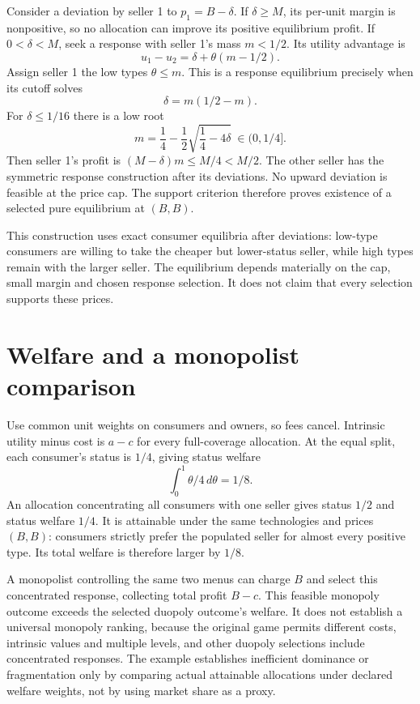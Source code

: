\documentclass[11pt]{article}
\begin{document}
Consider a deviation by seller 1 to $p_1=B-\delta$. If $\delta\geq M$, its per-unit margin is nonpositive, so no allocation can improve its positive equilibrium profit. If $0<\delta<M$, seek a response with seller 1's mass $m<1/2$. Its utility advantage is
\[
                    u_1-u_2=\delta+\theta(m-1/2).
\]
Assign seller 1 the low types $\theta\leq m$. This is a response equilibrium precisely when its cutoff solves
\[
                     \delta=m(1/2-m).
\]
For $\delta\leq1/16$ there is a low root
\[
                     m=\frac14-\frac12\sqrt{\frac14-4\delta}
                       \ \in(0,1/4].
\]
Then seller 1's profit is $(M-\delta)m\leq M/4<M/2$. The other seller has the symmetric response construction after its deviations. No upward deviation is feasible at the price cap. The support criterion therefore proves existence of a selected pure equilibrium at $(B,B)$.

This construction uses exact consumer equilibria after deviations: low-type consumers are willing to take the cheaper but lower-status seller, while high types remain with the larger seller. The equilibrium depends materially on the cap, small margin and chosen response selection. It does not claim that every selection supports these prices.

\section*{Welfare and a monopolist comparison}
Use common unit weights on consumers and owners, so fees cancel. Intrinsic utility minus cost is $a-c$ for every full-coverage allocation. At the equal split, each consumer's status is $1/4$, giving status welfare
\[
                          \int_0^1\theta/4\,d\theta=1/8.
\]
An allocation concentrating all consumers with one seller gives status $1/2$ and status welfare $1/4$. It is attainable under the same technologies and prices $(B,B)$: consumers strictly prefer the populated seller for almost every positive type. Its total welfare is therefore larger by $1/8$.

A monopolist controlling the same two menus can charge $B$ and select this concentrated response, collecting total profit $B-c$. This feasible monopoly outcome exceeds the selected duopoly outcome's welfare. It does not establish a universal monopoly ranking, because the original game permits different costs, intrinsic values and multiple levels, and other duopoly selections include concentrated responses. The example establishes inefficient dominance or fragmentation only by comparing actual attainable allocations under declared welfare weights, not by using market share as a proxy.
\end{document}
